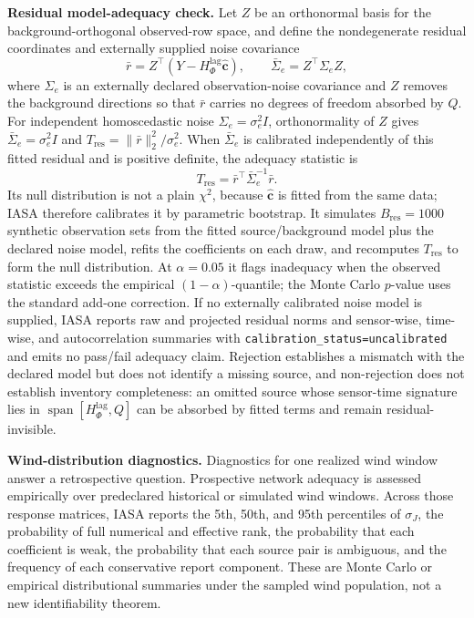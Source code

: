 \noindent\textbf{Residual model-adequacy check.}
Let \(Z\) be an orthonormal basis for the background-orthogonal observed-row
space, and define the nondegenerate residual coordinates and externally supplied
noise covariance
\begin{equation}
\bar r=Z^\top(Y-H_\Phi^{\mathrm{lag}}\widehat{\mathbf c}),
\qquad
\bar\Sigma_e=Z^\top\Sigma_e Z,
\label{eq:adequacy_coordinates}
\end{equation}
where \(\Sigma_e\) is an externally declared observation-noise covariance and
\(Z\) removes the background directions so that \(\bar r\) carries no degrees of
freedom absorbed by \(Q\).  For independent homoscedastic noise
\(\Sigma_e=\sigma_e^2 I\), orthonormality of \(Z\) gives
\(\bar\Sigma_e=\sigma_e^2 I\) and \(T_{\mathrm{res}}=\|\bar r\|_2^2/\sigma_e^2\).
When \(\bar\Sigma_e\) is calibrated independently of this fitted residual and is
positive definite, the adequacy statistic is
\begin{equation}
T_{\mathrm{res}}=\bar r^\top\bar\Sigma_e^{-1}\bar r.
\label{eq:residual_adequacy_statistic}
\end{equation}
Its null distribution is not a plain \(\chi^2\), because \(\widehat{\mathbf c}\)
is fitted from the same data; IASA therefore calibrates it by parametric
bootstrap.  It simulates \(B_{\mathrm{res}}=1000\) synthetic observation sets from
the fitted source/background model plus the declared noise model, refits the
coefficients on each draw, and recomputes \(T_{\mathrm{res}}\) to form the null
distribution.  At \(\alpha=0.05\) it flags inadequacy when the observed statistic
exceeds the empirical \((1-\alpha)\)-quantile; the Monte Carlo \(p\)-value uses
the standard add-one correction.  If no externally calibrated noise model is
supplied, IASA reports raw and projected residual norms and sensor-wise,
time-wise, and autocorrelation summaries with
\texttt{calibration\_status=uncalibrated} and emits no pass/fail adequacy claim.
Rejection establishes a mismatch with the declared model but does not identify a
missing source, and non-rejection does not establish inventory completeness: an
omitted source whose sensor-time signature lies in
\(\operatorname{span}[H_\Phi^{\mathrm{lag}},Q]\) can be absorbed by fitted terms
and remain residual-invisible.

\noindent\textbf{Wind-distribution diagnostics.}
Diagnostics for one realized wind window answer a retrospective question.
Prospective network adequacy is assessed empirically over predeclared historical
or simulated wind windows.  Across those response matrices, IASA reports the
5th, 50th, and 95th percentiles of \(\sigma_J\), the probability of full
numerical and effective rank, the probability that each coefficient is weak,
the probability that each source pair is ambiguous, and the frequency of each
conservative report component.  These are Monte Carlo or empirical
distributional summaries under the sampled wind population, not a new
identifiability theorem.

